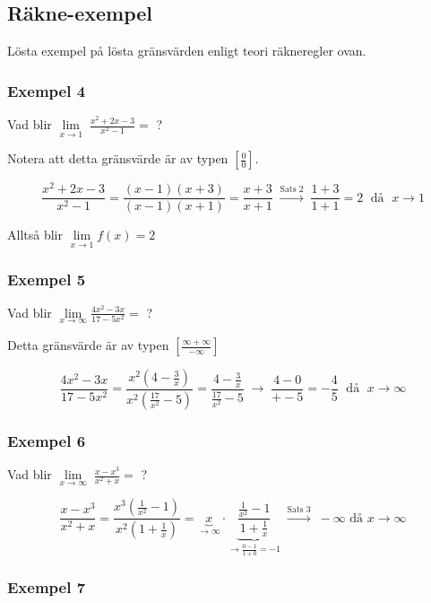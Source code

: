 \documentclass[swedish]{article}
\begin{document}
\subsection{Räkne-exempel}

Lösta exempel på lösta gränsvärden enligt teori räkneregler ovan. 

\subsubsection{Exempel 4}

Vad blir $\lim\limits_{x \to 1} \; \frac{x^2 + 2x - 3}{x^2 - 1} = $ ?

\smallbreak

Notera att detta gränsvärde är av typen $\left[ \frac{0}{0} \right]$.

$$\frac{x^2 + 2x - 3}{x^2 - 1} = \frac{(x-1)(x+3)}{(x-1)(x+1)} = \frac{x+3}{x+1} \; \xrightarrow{\text{Sats 2}} \; \frac{1+3}{1+1} = 2 \; \text{ då } \; x \to 1$$

Alltså blir $\lim\limits_{x \to 1} f(x) = 2$

\subsubsection{Exempel 5}

Vad blir $\lim\limits_{x \to \infty} \frac{4x^2 - 3x}{17-5x^2} =$ ?

\smallbreak

Detta gränsvärde är av typen $\left[ \frac{\infty + \infty}{- \infty} \right]$

$$\frac{4x^2 - 3x}{17-5x^2} = \frac{x^2(4-\frac{3}{x})}{x^2(\frac{17}{x^2}-5)} = \frac{4-\frac{3}{x}}{\frac{17}{x^2} - 5} \; \to \; \frac{4 - 0}{+ - 5} = -\frac{4}{5} \; \text{ då } \; x \to \infty$$

\subsubsection{Exempel 6}

Vad blir $\lim\limits_{x \to \infty} \; \frac{x - x^3}{x^2 + x} =$ ?

\bigbreak

$$\frac{x-x^3}{x^2+x} = \frac{x^3(\frac{1}{x^2}-1)}{x^2(1+\frac{1}{x})} = \underbrace{x}_{\to \infty} \cdot \underbrace{\frac{\frac{1}{x^2}-1}{1+\frac{1}{x}}}_{\to \frac{0-1}{1+0} = -1} \; \xrightarrow{\text{Sats 3}} \; - \infty \text{ då } x \to \infty$$

\subsubsection{Exempel 7}
\end{document}
